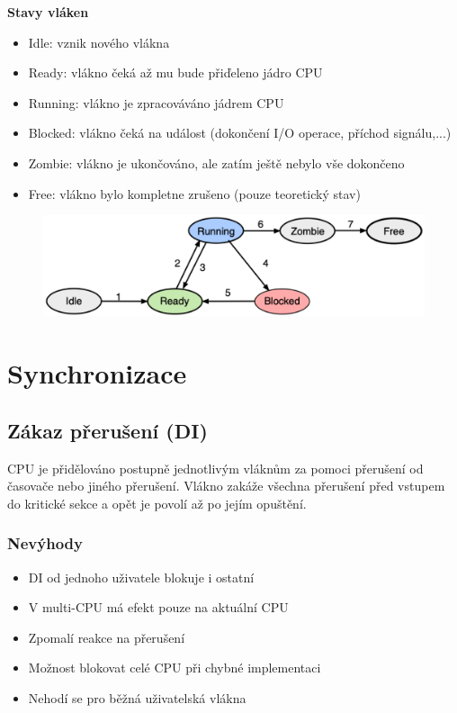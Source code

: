\documentclass{szzclass}
\begin{document}
\textbf{Stavy vláken}
\begin{itemize}
    \item Idle: vznik nového vlákna
    \item Ready: vlákno čeká až mu bude přiďeleno jádro CPU
    \item Running: vlákno je zpracováváno jádrem CPU
    \item Blocked: vlákno čeká na událost (dokončení I/O operace, příchod signálu,...)
    \item Zombie: vlákno je ukončováno, ale zatím ještě nebylo vše dokončeno
    \item Free: vlákno bylo kompletne zrušeno (pouze teoretický stav)
\end{itemize}

\begin{figure}[h]
    \includegraphics[width=.8\textwidth, center]{topics/bi-spol-16/images/stavy.png}
\end{figure}

\newpage

\section{Synchronizace}

\subsection{Zákaz přerušení (DI)}

CPU je přidělováno postupně jednotlivým vláknům za pomoci přerušení od časovače nebo jiného přerušení.
Vlákno zakáže všechna přerušení před vstupem do kritické sekce a opět je povolí až po jejím opuštění.

\subsubsection{Nevýhody}
\begin{itemize}
    \item DI od jednoho uživatele blokuje i ostatní
    \item V multi-CPU má efekt pouze na aktuální CPU
    \item Zpomalí reakce na přerušení
    \item Možnost blokovat celé CPU při chybné implementaci
    \item Nehodí se pro běžná uživatelská vlákna
\end{itemize}
\end{document}
